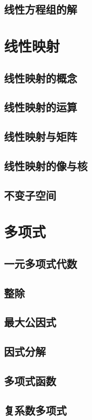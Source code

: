 \documentclass[a4paper, 11pt]{ctexbook}
\begin{document}
        \section{线性方程组的解}
    \chapter{线性映射}
        \section{线性映射的概念}
        \section{线性映射的运算}
        \section{线性映射与矩阵}
        \section{线性映射的像与核}
        \section{不变子空间}
    \chapter{多项式}
        \section{一元多项式代数}
        \section{整除}
        \section{最大公因式}
        \section{因式分解}
        \section{多项式函数}
        \section{复系数多项式}
\end{document}
